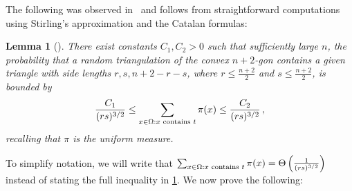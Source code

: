 \documentclass[a4paper, 12p]{article}
\numberwithin{equation}{section}
\newtheorem{lemma}[theorem]{Lemma}
\begin{document}
The following was observed in~\cite{eppstein2022improved, mrs} and follows from straightforward computations using Stirling's approximation and the Catalan formulas:

\begin{lemma}[\cite{eppstein2022improved, mrs}]
    There exist constants $C_1, C_2 > 0$ such that sufficiently large $n$, the probability that a random triangulation of the convex $n+2$-gon contains a given triangle with side lengths $r, s, n+2-r-s$, where $r \leq \frac{n+2}{2}$ and $s \leq \frac{n+2}{2}$, is bounded by
    \[
        \frac{C_1}{(rs)^{3/2}} \leq \sum_{x\in \Omega: x \textnormal{ contains } t}\pi(x) \leq \frac{C_2}{(rs)^{3/2}}\,,
    \]
    recalling that $\pi$ is the uniform measure.
    \label{lem:sidelengths}
\end{lemma}
To simplify notation, we will write that $\sum_{x\in \Omega: x \textnormal{ contains } t}\pi(x) = \Theta\left(\frac{1}{(rs)^{3/2}}\right)$ instead of stating the full inequality in \cref{lem:sidelengths}. We now prove the following:
\end{document}
